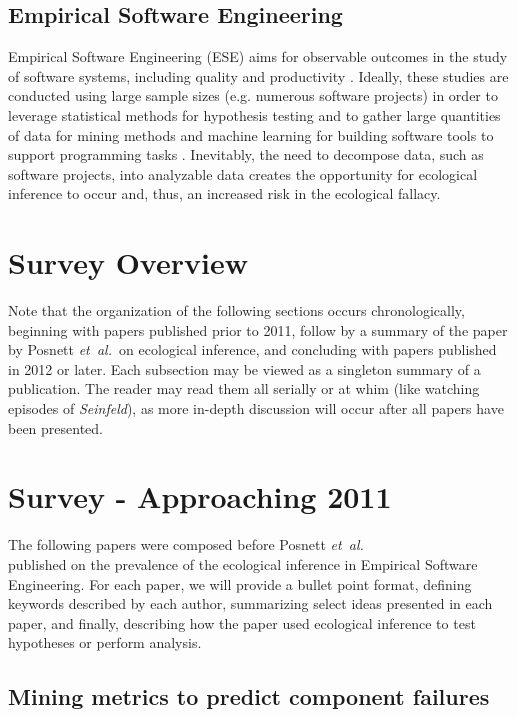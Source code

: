 \documentclass{sig-alternate-05-2015}
\newcommand{\etal}{\mbox{\emph{et al.\ }}}
\begin{document}
\subsection{Empirical Software Engineering}
Empirical Software Engineering (ESE) aims for observable outcomes in the study of software systems, including quality and productivity \cite{Posnett:2011}.  Ideally, these studies are conducted using large sample sizes (e.g. numerous software projects) in order to leverage statistical methods for hypothesis testing and to gather large quantities of data for mining methods and machine learning for building software tools to support programming tasks \cite{Posnett:2011}.  Inevitably, the need to decompose data, such as software projects, into analyzable data creates the opportunity for ecological inference to occur and, thus, an increased risk in the ecological fallacy.

\section{Survey Overview}

Note that the organization of the following sections occurs chronologically, beginning with papers published prior to 2011, follow by a summary of the paper by Posnett \etal on ecological inference, and concluding with papers published in 2012 or later. Each subsection may be viewed as a singleton summary of a publication.  The reader may read them all serially or at whim (like watching episodes of \emph{Seinfeld}), as more in-depth discussion will occur after all papers have been presented.

\section{Survey - Approaching 2011}

The following papers were composed before Posnett \etal  \\
published on the prevalence of the ecological inference in Empirical Software Engineering.  For each paper, we will provide a bullet point format, defining keywords described by each author, summarizing select ideas presented in each paper, and finally, describing how the paper used ecological inference to test hypotheses or perform analysis.

\subsection{Mining metrics to predict component failures \cite{Nagappan:2006}}
\end{document}
